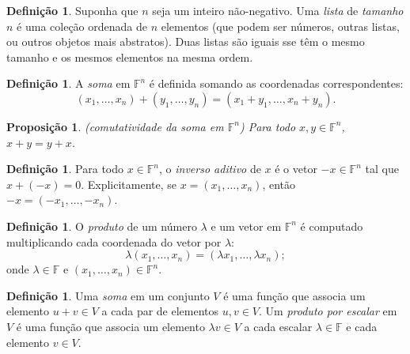 \documentclass[12pt]{article}
\theoremstyle{plain}
\newtheorem{prop}[thm]{Proposição}
\theoremstyle{definition}
\newtheorem{defn}[thm]{Definição}
\theoremstyle{remark}
\begin{document}
\begin{defn}
    Suponha que \(n\) seja um inteiro não-negativo. Uma \emph{lista} de \emph{tamanho} \(n\) é uma coleção ordenada de \(n\) elementos (que podem ser números, outras listas, ou outros objetos mais abstratos). Duas listas são iguais sse têm o mesmo tamanho e os mesmos elementos na mesma ordem.
\end{defn}

\begin{defn}
    A \emph{soma} em \(\mathbb{F}^n\) é definida somando as coordenadas correspondentes:
    \[
        (x_1, \ldots, x_n) + (y_1, \ldots, y_n) = (x_1 + y_1, \ldots, x_n + y_n).
    \]
\end{defn}

\begin{prop} (comutatividade da soma em \(\mathbb{F}^n\))
    Para todo \(x, y \in \mathbb{F}^n\), \(x + y = y + x\).
\end{prop}

\begin{defn}
    Para todo \(x \in \mathbb{F}^n\), o \emph{inverso aditivo} de \(x\) é o vetor \(-x \in \mathbb{F}^n\) tal que \(x + (-x) = 0\). Explicitamente, se \(x = (x_1, \ldots, x_n)\), então \(-x = (-x_1, \ldots, -x_n)\).
\end{defn}

\begin{defn}
    O \emph{produto} de um número \(\lambda\) e um vetor em \(\mathbb{F}^n\) é computado multiplicando cada coordenada do vetor por \(\lambda\):
    \[
        \lambda (x_1, \ldots, x_n) = (\lambda x_1, \ldots, \lambda x_n);
    \]
    \noindent onde \(\lambda \in \mathbb{F}\) e \((x_1, \ldots, x_n) \in \mathbb{F}^n\).
\end{defn}

\begin{defn}
    Uma \emph{soma} em um conjunto \(V\) é uma função que associa um elemento \(u + v \in V\) a cada par de elementos \(u, v \in V\). Um \emph{produto por escalar} em \(V\) é uma função que associa um elemento \(\lambda v \in V\) a cada escalar \(\lambda \in \mathbb{F}\) e cada elemento \(v \in V\). 
\end{defn}
\end{document}
